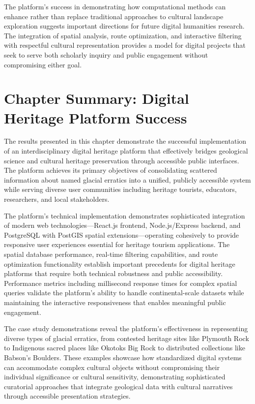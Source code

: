 The platform's success in demonstrating how computational methods can enhance rather than replace traditional approaches to cultural landscape exploration suggests important directions for future digital humanities research. The integration of spatial analysis, route optimization, and interactive filtering with respectful cultural representation provides a model for digital projects that seek to serve both scholarly inquiry and public engagement without compromising either goal.

\section{Chapter Summary: Digital Heritage Platform Success}
\label{sec:results_summary}

The results presented in this chapter demonstrate the successful implementation of an interdisciplinary digital heritage platform that effectively bridges geological science and cultural heritage preservation through accessible public interfaces. The platform achieves its primary objectives of consolidating scattered information about named glacial erratics into a unified, publicly accessible system while serving diverse user communities including heritage tourists, educators, researchers, and local stakeholders.

The platform's technical implementation demonstrates sophisticated integration of modern web technologies—React.js frontend, Node.js/Express backend, and PostgreSQL with PostGIS spatial extensions—operating cohesively to provide responsive user experiences essential for heritage tourism applications. The spatial database performance, real-time filtering capabilities, and route optimization functionality establish important precedents for digital heritage platforms that require both technical robustness and public accessibility. Performance metrics including millisecond response times for complex spatial queries validate the platform's ability to handle continental-scale datasets while maintaining the interactive responsiveness that enables meaningful public engagement.

The case study demonstrations reveal the platform's effectiveness in representing diverse types of glacial erratics, from contested heritage sites like Plymouth Rock to Indigenous sacred places like Okotoks Big Rock to distributed collections like Babson's Boulders. These examples showcase how standardized digital systems can accommodate complex cultural objects without compromising their individual significance or cultural sensitivity, demonstrating sophisticated curatorial approaches that integrate geological data with cultural narratives through accessible presentation strategies.

